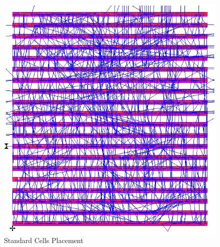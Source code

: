 \documentclass[11pt]{article}
\begin{document}
		\begin{figure}[H] 
			\centering 
			\includegraphics[width=\textwidth,height=\dimexpr\textheight-4\baselineskip-\abovecaptionskip-\belowcaptionskip\relax,keepaspectratio]{"Pictures/Std Cells"}
			\caption{Standard Cells Placement} 
			\label{fig:Std-Cells} 
		\end{figure}
		
\end{document}
